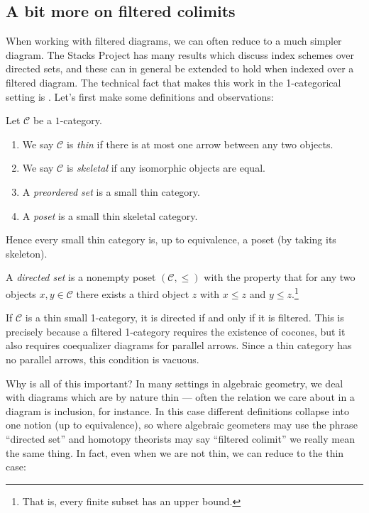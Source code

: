 \documentclass[11pt,openany]{book}
\begin{document}
\subsection{A bit more on filtered colimits}

When working with filtered diagrams, we can often reduce to a much simpler diagram. The Stacks Project has many results which discuss index schemes over directed sets, and these can in general be extended to hold when indexed over a filtered diagram. The technical fact that makes this work in the 1-categorical setting is . Let's first make some definitions and observations:

\begin{definition}\label{def:thin-skeletal-category} Let $\mathscr{C}$ be a $1$-category.
\begin{enumerate}
    \item We say $\mathscr{C}$ is \emph{thin} if there is at most one arrow between any two objects.
    \item We say $\mathscr{C}$ is \emph{skeletal} if any isomorphic objects are equal.
    \item A \emph{preordered set} is a small thin category.
    \item A \emph{poset} is a small thin skeletal category.
\end{enumerate}
Hence every small thin category is, up to equivalence, a poset (by taking its skeleton).
\end{definition}


\begin{definition}\label{def:directed-set}
A \emph{directed set} is a nonempty poset $(\mathscr{C},\le)$ with the property that for any two objects $x,y\in \mathscr{C}$ there exists a third object $z$ with $x\le z$ and $y\le z$.\footnote{That is, every finite subset has an upper bound.}
\end{definition}

\begin{remark} If $\mathscr{C}$ is a thin small 1-category, it is directed if and only if it is filtered. This is precisely because a filtered 1-category requires the existence of cocones, but it also requires coequalizer diagrams for parallel arrows. Since a thin category has no parallel arrows, this condition is vacuous.
\end{remark}

Why is all of this important? In many settings in algebraic geometry, we deal with diagrams which are by nature thin --- often the relation we care about in a diagram is inclusion, for instance. In this case different definitions collapse into one notion (up to equivalence), so where algebraic geometers may use the phrase ``directed set'' and homotopy theorists may say ``filtered colimit'' we really mean the same thing. In fact, even when we are not thin, we can reduce to the thin case:
\end{document}

